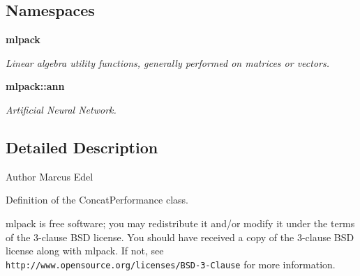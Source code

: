 \subsection*{Namespaces}
\begin{DoxyCompactItemize}
\item 
 {\bf mlpack}
\begin{DoxyCompactList}\small\item\em Linear algebra utility functions, generally performed on matrices or vectors. \end{DoxyCompactList}\item 
 {\bf mlpack\+::ann}
\begin{DoxyCompactList}\small\item\em Artificial Neural Network. \end{DoxyCompactList}\end{DoxyCompactItemize}


\subsection{Detailed Description}
\begin{DoxyAuthor}{Author}
Marcus Edel
\end{DoxyAuthor}
Definition of the Concat\+Performance class.

mlpack is free software; you may redistribute it and/or modify it under the terms of the 3-\/clause B\+SD license. You should have received a copy of the 3-\/clause B\+SD license along with mlpack. If not, see {\tt http\+://www.\+opensource.\+org/licenses/\+B\+S\+D-\/3-\/\+Clause} for more information. 